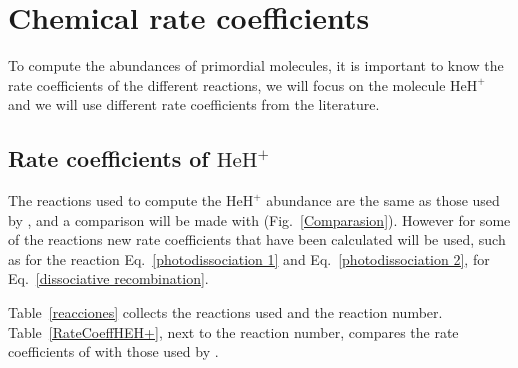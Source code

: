 \documentclass[baaa]{baaa}
\begin{document}
\section{Chemical rate coefficients}
To compute the abundances of primordial molecules, it is important to know the rate coefficients of the different reactions, we will focus on the molecule $\mathrm{HeH^+}$ and we will use different rate coefficients from the literature. 

\subsection{Rate coefficients of $\mathrm{HeH^+}$}


The reactions used to compute the $\mathrm{HeH^+}$ abundance are the same as those used by \citet{Schleicher2008}, and a comparison will be made with \citet{GP98} (Fig.~\ref{Comparasion}). However for some of the reactions new rate coefficients that have been calculated will be used, such as \citet{Coppola2017} for the reaction Eq.~\ref{photodissociation 1} and Eq.~\ref{photodissociation 2}, \citet{Novotny2019} for Eq.~\ref{dissociative recombination}.

Table~\ref{reacciones} collects the reactions used and the reaction number. Table~\ref{RateCoeffHEH+}, next to the reaction number, compares the rate coefficients of \citet{GP98} with those used by \citet{Schleicher2008}.
\end{document}
